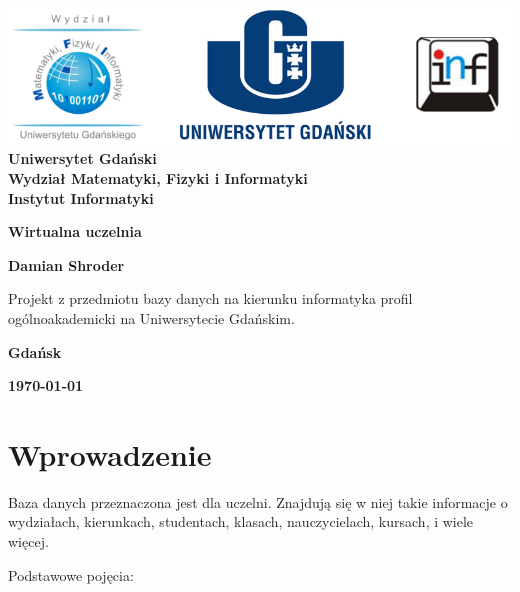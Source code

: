 \documentclass[12pt,a4paper]{article}
\newcommand{\hmwkTitle}{Wirtualna uczelnia} %
\newcommand{\hmwkDueDate}{\today} %
\newcommand{\hmwkAuthorName}{Damian Shroder} %
\begin{document}
\begin{titlepage}
    \vfill
	\begin{center}
	\hspace*{-1cm}
	\vspace*{0.5cm}
    \includegraphics[scale=0.55]{loga.png}\\
	\textbf{Uniwersytet Gdański \\ [0.05cm]Wydział Matematyki, Fizyki i Informatyki \\ [0.05cm] Instytut Informatyki}

	\vspace{0.6cm}
	\vspace{4cm}
	{\huge \textbf{\hmwkTitle}}\vspace{8mm}
	
	{\large \textbf{\hmwkAuthorName}}\\[3cm]
	
		\hspace{.45\textwidth} %
	   \begin{minipage}{.5\textwidth}
	   Projekt z przedmiotu bazy danych na kierunku informatyka profil ogólnoakademicki na Uniwersytecie Gdańskim.\\[0.1cm]
	  \end{minipage}
	  \vfill
	
	\textbf{Gdańsk}
	
	\textbf{\hmwkDueDate}
	\end{center}
	
\end{titlepage}

\newpage
\setcounter{secnumdepth}{5}
\tableofcontents
\newpage

\section{Wprowadzenie}
\label{sec:introduction}
Baza danych przeznaczona jest dla uczelni. Znajdują się w niej takie informacje o wydziałach, kierunkach, studentach, klasach, nauczycielach, kursach, i wiele więcej.

Podstawowe pojęcia:
\end{document}
